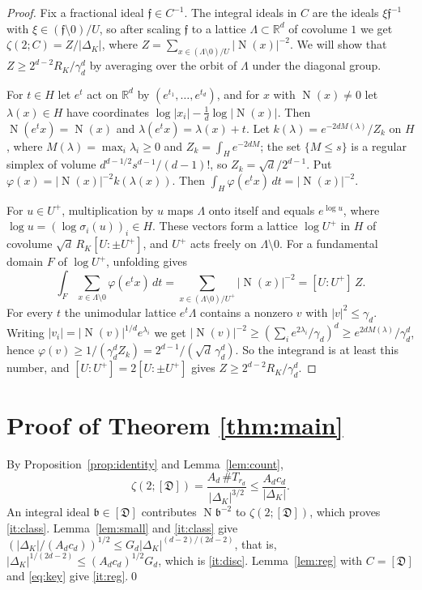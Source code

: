 \documentclass[11pt]{amsart}
\theoremstyle{definition}
\numberwithin{equation}{section}
\DeclareMathOperator{\N}{N}
\newcommand{\Dif}{\mathfrak{D}}
\newcommand{\R}{\mathbb{R}}
\begin{document}
\begin{proof}
Fix a fractional ideal $\mathfrak f\in C^{-1}$.  The integral ideals in $C$ are the ideals
$\xi\mathfrak f^{-1}$ with $\xi\in(\mathfrak f\setminus0)/U$, so after scaling $\mathfrak f$ to a
lattice $\Lambda\subset\R^d$ of covolume $1$ we get $\zeta(2;C)=Z/|\Delta_K|$, where
$Z=\sum_{x\in(\Lambda\setminus0)/U}|\N(x)|^{-2}$.  We will show that $Z\ge2^{d-2}R_K/\gamma_d^d$ by
averaging over the orbit of $\Lambda$ under the diagonal group.

For $t\in H$ let $e^t$ act on $\R^d$ by $(e^{t_1},\dots,e^{t_d})$, and for $x$ with $\N(x)\ne0$ let
$\lambda(x)\in H$ have coordinates $\log|x_i|-\frac1d\log|\N(x)|$.  Then $\N(e^tx)=\N(x)$ and
$\lambda(e^tx)=\lambda(x)+t$.  Let $k(\lambda)=e^{-2dM(\lambda)}/Z_k$ on $H$, where
$M(\lambda)=\max_i\lambda_i\ge0$ and $Z_k=\int_He^{-2dM}$; the set $\{M\le s\}$ is a regular simplex of
volume $d^{d-1/2}s^{d-1}/(d-1)!$, so $Z_k=\sqrt d/2^{d-1}$.  Put $\varphi(x)=|\N(x)|^{-2}k(\lambda(x))$.
Then $\int_H\varphi(e^tx)\,dt=|\N(x)|^{-2}$.

For $u\in U^+$, multiplication by $u$ maps $\Lambda$ onto itself and equals $e^{\log u}$, where
$\log u=(\log\sigma_i(u))_i\in H$.  These vectors form a lattice $\log U^+$ in $H$ of covolume
$\sqrt d\,R_K[U:\pm U^+]$, and $U^+$ acts freely on $\Lambda\setminus0$.  For a fundamental domain $F$
of $\log U^+$, unfolding gives
\[
  \int_F\sum_{x\in\Lambda\setminus0}\varphi(e^tx)\,dt=\sum_{x\in(\Lambda\setminus0)/U^+}|\N(x)|^{-2}=[U:U^+]\,Z .
\]
For every $t$ the unimodular lattice $e^t\Lambda$ contains a nonzero $v$ with $|v|^2\le\gamma_d$.
Writing $|v_i|=|\N(v)|^{1/d}e^{\lambda_i}$ we get $|\N(v)|^{-2}\ge(\sum_ie^{2\lambda_i}/\gamma_d)^d\ge e^{2dM(\lambda)}/\gamma_d^d$,
hence $\varphi(v)\ge1/(\gamma_d^dZ_k)=2^{d-1}/(\sqrt d\,\gamma_d^d)$.  So the integrand is at least this
number, and $[U:U^+]=2[U:\pm U^+]$ gives $Z\ge2^{d-2}R_K/\gamma_d^d$.
\end{proof}

\section{Proof of Theorem \ref{thm:main}}\label{sec:proof}

By Proposition~\ref{prop:identity} and Lemma~\ref{lem:count},
\begin{equation}\label{eq:key}
  \zeta(2;[\Dif])=\frac{A_d\,\#T_{r_d}}{|\Delta_K|^{3/2}}\le\frac{A_dc_d}{|\Delta_K|} .
\end{equation}
An integral ideal $\mathfrak b\in[\Dif]$ contributes $\N\mathfrak b^{-2}$ to $\zeta(2;[\Dif])$, which
proves \ref{it:class}.  Lemma~\ref{lem:small} and \ref{it:class} give
$(|\Delta_K|/(A_dc_d))^{1/2}\le G_d|\Delta_K|^{(d-2)/(2d-2)}$, that is,
$|\Delta_K|^{1/(2d-2)}\le(A_dc_d)^{1/2}G_d$, which is \ref{it:disc}.  Lemma~\ref{lem:reg} with
$C=[\Dif]$ and \eqref{eq:key} give \ref{it:reg}.\qed
\end{document}
